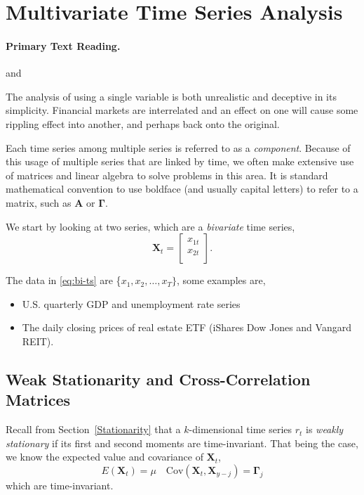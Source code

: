 \section{Multivariate Time Series Analysis}
\paragraph{Primary Text Reading.} 
and 

The analysis of \fts{} using a single variable is both unrealistic and deceptive in its simplicity. Financial markets are interrelated and an effect on one will cause some rippling effect into another, and perhaps back onto the original.

Each time series among multiple series is referred to as a \emph{component}. Because of this usage of multiple series that are linked by time, we often make extensive use of matrices and linear algebra to solve problems in this area.
It is standard mathematical convention to use boldface (and usually capital letters) to refer to a matrix, such as $\mathbf{A}$ or $\mathbf{\Gamma}$.

We start by looking at two series, which are a \emph{bivariate} time series,
\begin{equation}
\mathbf{X}_t =
	\begin{bmatrix}
	x_{1t} \\
	x_{2t} \\
	\end{bmatrix}.
\label{eq:bi-ts}
\end{equation}

The data in \eqref{eq:bi-ts} are \{$x_1, x_2, \ldots, x_T\}$, some examples are,
\begin{itemize}
	\item U.S. quarterly GDP and unemployment rate series
	\item The daily closing prices of real estate ETF (iShares Dow Jones and Vangard REIT).
\end{itemize}

\subsection{Weak Stationarity and Cross-Correlation Matrices}\label{crosscorrmatr}
Recall from Section~\ref{Stationarity} that a $k$-dimensional time series $r_t$ is \emph{weakly stationary} if its first and second moments are time-invariant. That being the case, we know the expected value and covariance of $\mathbf{X}_t$,
\[
E(\mathbf{X}_t) = \mu \quad \text{Cov}(\mathbf{X}_t, \mathbf{X}_{y-j}) = \mathbf{\Gamma}_j
\]
which are time-invariant.

